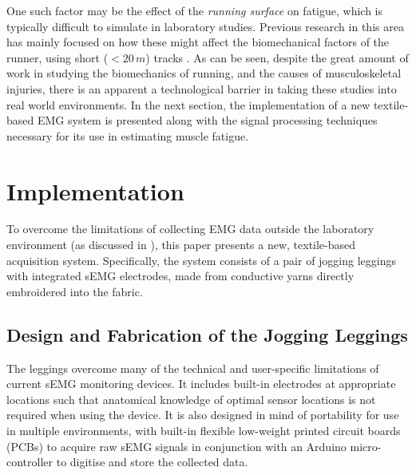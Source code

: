 \documentclass[letterpaper, 10 pt, conference]{ieeeconf}
\begin{document}
One such factor may be the effect of the \emph{running surface} on fatigue, which is typically difficult to simulate in laboratory studies. Previous
research in this area has mainly focused on how these might affect the
biomechanical factors of the runner, using short ($<20\,m$) tracks \cite{ferris1998running,pinnington2005kinematic,tillman2002shoe}. As can be seen, despite the great amount of work in studying the biomechanics
of running, and the causes of musculoskeletal injuries, there is an apparent a
technological barrier in taking these studies into real world environments. In
the next section, the implementation of a new textile-based EMG system is
presented along with the signal processing techniques necessary for its use in
estimating muscle fatigue.












\section{Implementation}\label{s:methodology}
To overcome the limitations of collecting EMG data outside the laboratory
environment (as discussed in ), this paper presents a new,
textile-based acquisition system. Specifically, the system consists of a pair
of jogging leggings with integrated sEMG electrodes, made from conductive yarns
directly embroidered into the fabric. 

\subsection{Design and Fabrication of the Jogging Leggings}
The leggings overcome many of the technical and user-specific limitations of
current sEMG monitoring devices. It includes built-in electrodes at appropriate
locations such that anatomical knowledge of optimal sensor locations is not
required when using the device.  It is also designed in mind of portability
for use in multiple environments, with built-in flexible low-weight printed
circuit boards (PCBs) to acquire raw sEMG signals in conjunction with an
Arduino micro-controller to digitise and store the collected data.
\end{document}
